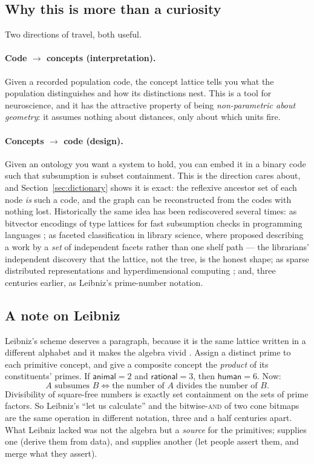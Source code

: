 \subsection{Why this is more than a curiosity}

Two directions of travel, both useful.

\paragraph{Code $\to$ concepts (interpretation).} Given a recorded population
code, the concept lattice tells you what the population distinguishes and how
its distinctions nest. This is a tool for neuroscience, and it has the
attractive property of being \emph{non-parametric about geometry}: it assumes
nothing about distances, only about which units fire.

\paragraph{Concepts $\to$ code (design).} Given an ontology you want a system
to hold, you can embed it in a binary code such that subsumption is subset
containment. This is the direction \odag{} cares about, and
Section~\ref{sec:dictionary} shows it is exact: the reflexive ancestor set of
each node \emph{is} such a code, and the graph can be reconstructed from the
codes with nothing lost. Historically the same idea has been rediscovered
several times: as bitvector encodings of type lattices for fast subsumption
checks in programming languages \citep{aitkaci1989}; as faceted
classification in library science, where \citet{ranganathan1933} proposed
describing a work by a \emph{set} of independent facets rather than one
shelf path --- the librarians' independent discovery that the lattice, not
the tree, is the honest shape; as sparse distributed
representations and hyperdimensional computing
\citep{kanerva2009,plate1995}; and, three centuries earlier, as Leibniz's
prime-number notation.

\subsection{A note on Leibniz}
\label{sec:leibniz-note}

Leibniz's scheme deserves a paragraph, because it is the same lattice written
in a different alphabet and it makes the algebra vivid \citep{leibniz1666}.
Assign a distinct prime to each primitive concept, and give a composite
concept the \emph{product} of its constituents' primes. If
$\textsf{animal} = 2$ and $\textsf{rational} = 3$, then $\textsf{human} = 6$.
Now:
\[
  A \text{ subsumes } B \iff \text{the number of } A \text{ divides the number
  of } B .
\]
Divisibility of square-free numbers is exactly set containment on the sets of
prime factors. So Leibniz's ``let us calculate'' and the bitwise-\textsc{and}
of two cone bitmaps are the same operation in different notation, three and a
half centuries apart. What Leibniz lacked was not the algebra but a
\emph{source} for the primitives; \fca{} supplies one (derive them from data),
and \odag{} supplies another (let people assert them, and merge what they
assert).

